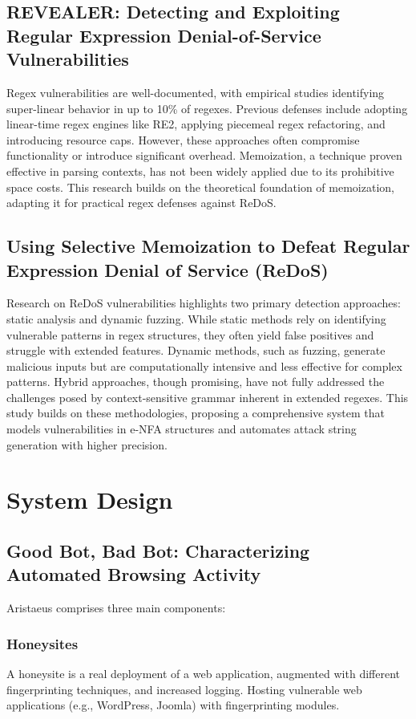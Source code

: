 \documentclass[conference]{IEEEtran}
\begin{document}
\subsection{\textbf{REVEALER: Detecting and Exploiting Regular Expression Denial-of-Service Vulnerabilities}}
Regex vulnerabilities are well-documented, with empirical studies identifying super-linear behavior in up to 10\% of regexes. Previous defenses include adopting linear-time regex engines like RE2, applying piecemeal regex refactoring, and introducing resource caps. However, these approaches often compromise functionality or introduce significant overhead. Memoization, a technique proven effective in parsing contexts, has not been widely applied due to its prohibitive space costs. This research builds on the theoretical foundation of memoization, adapting it for practical regex defenses against ReDoS.

\subsection{\textbf{Using Selective Memoization to Defeat Regular Expression Denial of Service (ReDoS)}}
Research on ReDoS vulnerabilities highlights two primary detection approaches: static analysis and dynamic fuzzing. While static methods rely on identifying vulnerable patterns in regex structures, they often yield false positives and struggle with extended features. Dynamic methods, such as fuzzing, generate malicious inputs but are computationally intensive and less effective for complex patterns. Hybrid approaches, though promising, have not fully addressed the challenges posed by context-sensitive grammar inherent in extended regexes. This study builds on these methodologies, proposing a comprehensive system that models vulnerabilities in e-NFA structures and automates attack string generation with higher precision.

\section{System Design}
\subsection{\textbf{Good Bot, Bad Bot: Characterizing Automated Browsing Activity}}
Aristaeus comprises three main components:
\subsubsection{Honeysites}
A honeysite is a real deployment of a web application, augmented with different fingerprinting techniques, and
increased logging. Hosting vulnerable web applications (e.g., WordPress, Joomla) with fingerprinting modules.
\end{document}
